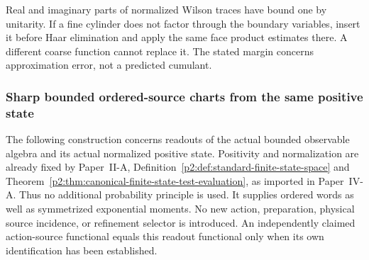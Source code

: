 \documentclass[12pt,a4paper]{article}
\begin{document}
Real and imaginary parts of normalized Wilson traces have bound one by
unitarity. If a fine cylinder does not factor through the boundary
variables, insert it before Haar elimination and apply the same face
product estimates there. A different coarse function cannot replace it.
The stated margin concerns approximation error, not a predicted cumulant.

\subsubsection{Sharp bounded ordered-source charts from the same positive state}
\label{p12:sec:v256-bounded-ordered-sources}
The following construction concerns readouts of the actual bounded
observable algebra and its actual normalized positive state.  Positivity
and normalization are already fixed by Paper~II-A,
Definition~\ref{p2:def:standard-finite-state-space} and
Theorem~\ref{p2:thm:canonical-finite-state-test-evaluation}, as imported
in Paper~IV-A.  Thus no additional probability principle is used.  It supplies
ordered words as well as symmetrized exponential moments.  No new action,
preparation, physical source incidence, or refinement selector is introduced.
An independently claimed action-source functional equals this readout
functional only when its own identification has been established.
\end{document}
